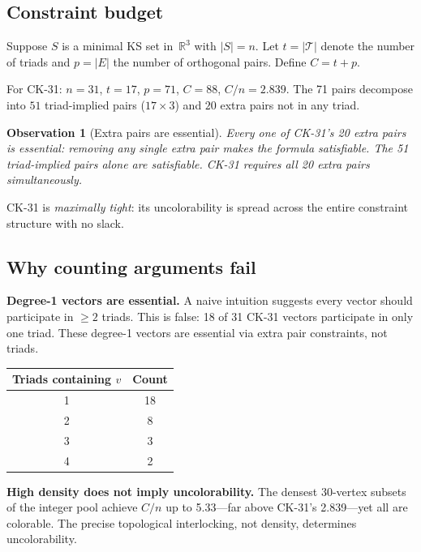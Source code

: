 \documentclass[twocolumn,pra,superscriptaddress,nofootinbib]{revtex4-2}
\newtheorem{observation}{Observation}
\newcommand{\R}{\mathbb{R}}
\begin{document}
\subsection{Constraint budget}\label{sec:budget}

Suppose $S$ is a minimal KS set in~$\R^3$ with $|S| = n$. Let $t = |\mathcal{T}|$ denote the number of triads and $p = |E|$ the number of orthogonal pairs. Define $C = t + p$.

For CK-31: $n = 31$, $t = 17$, $p = 71$, $C = 88$, $C/n = 2.839$. The 71 pairs decompose into $51$ triad-implied pairs ($17 \times 3$) and $20$ extra pairs not in any triad.

\begin{observation}[Extra pairs are essential]
\label{obs:extra}
Every one of CK-31's 20 extra pairs is essential: removing any single extra pair makes the formula satisfiable. The 51 triad-implied pairs alone are satisfiable. CK-31 requires all 20 extra pairs simultaneously.
\end{observation}

CK-31 is \emph{maximally tight}: its uncolorability is spread across the entire constraint structure with no slack.

\subsection{Why counting arguments fail}\label{sec:counting}

\textbf{Degree-1 vectors are essential.} A naive intuition suggests every vector should participate in $\geq 2$ triads. This is false: 18 of 31 CK-31 vectors participate in only one triad. These degree-1 vectors are essential via extra pair constraints, not triads.

\begin{center}
\begin{tabular}{cc}
\toprule
Triads containing $v$ & Count \\
\midrule
1 & 18 \\
2 & 8 \\
3 & 3 \\
4 & 2 \\
\bottomrule
\end{tabular}
\end{center}

\textbf{High density does not imply uncolorability.} The densest 30-vertex subsets of the integer pool achieve $C/n$ up to 5.33---far above CK-31's 2.839---yet all are colorable. The precise topological interlocking, not density, determines uncolorability.
\end{document}
